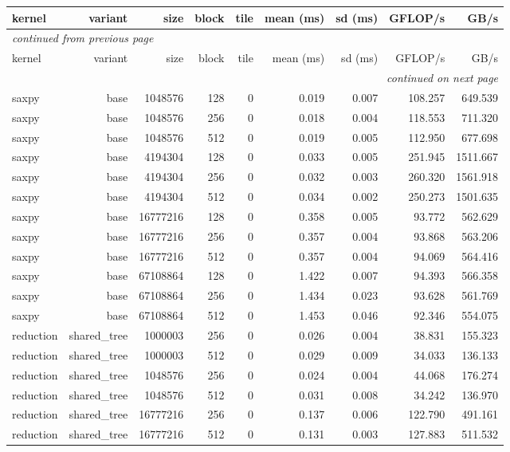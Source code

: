 \begin{longtable}{lrrrrrrrr}
\toprule
kernel & variant & size & block & tile & mean (ms) & sd (ms) & GFLOP/s & GB/s \\
\midrule
\endfirsthead
\multicolumn{9}{l}{\small\itshape continued from previous page} \\
\toprule
kernel & variant & size & block & tile & mean (ms) & sd (ms) & GFLOP/s & GB/s \\
\midrule
\endhead
\midrule
\multicolumn{9}{r}{\small\itshape continued on next page} \\
\endfoot
\bottomrule
\endlastfoot
saxpy & base & 1048576 & 128 & 0 & 0.019 & 0.007 & 108.257 & 649.539 \\
saxpy & base & 1048576 & 256 & 0 & 0.018 & 0.004 & 118.553 & 711.320 \\
saxpy & base & 1048576 & 512 & 0 & 0.019 & 0.005 & 112.950 & 677.698 \\
saxpy & base & 4194304 & 128 & 0 & 0.033 & 0.005 & 251.945 & 1511.667 \\
saxpy & base & 4194304 & 256 & 0 & 0.032 & 0.003 & 260.320 & 1561.918 \\
saxpy & base & 4194304 & 512 & 0 & 0.034 & 0.002 & 250.273 & 1501.635 \\
saxpy & base & 16777216 & 128 & 0 & 0.358 & 0.005 & 93.772 & 562.629 \\
saxpy & base & 16777216 & 256 & 0 & 0.357 & 0.004 & 93.868 & 563.206 \\
saxpy & base & 16777216 & 512 & 0 & 0.357 & 0.004 & 94.069 & 564.416 \\
saxpy & base & 67108864 & 128 & 0 & 1.422 & 0.007 & 94.393 & 566.358 \\
saxpy & base & 67108864 & 256 & 0 & 1.434 & 0.023 & 93.628 & 561.769 \\
saxpy & base & 67108864 & 512 & 0 & 1.453 & 0.046 & 92.346 & 554.075 \\
reduction & shared\_tree & 1000003 & 256 & 0 & 0.026 & 0.004 & 38.831 & 155.323 \\
reduction & shared\_tree & 1000003 & 512 & 0 & 0.029 & 0.009 & 34.033 & 136.133 \\
reduction & shared\_tree & 1048576 & 256 & 0 & 0.024 & 0.004 & 44.068 & 176.274 \\
reduction & shared\_tree & 1048576 & 512 & 0 & 0.031 & 0.008 & 34.242 & 136.970 \\
reduction & shared\_tree & 16777216 & 256 & 0 & 0.137 & 0.006 & 122.790 & 491.161 \\
reduction & shared\_tree & 16777216 & 512 & 0 & 0.131 & 0.003 & 127.883 & 511.532 \\

\end{longtable}
